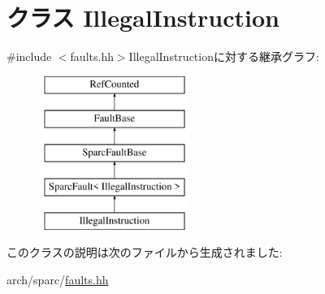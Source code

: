 \hypertarget{classSparcISA_1_1IllegalInstruction}{
\section{クラス IllegalInstruction}
\label{classSparcISA_1_1IllegalInstruction}
}


{\ttfamily \#include $<$faults.hh$>$}IllegalInstructionに対する継承グラフ:\begin{figure}[H]
\begin{center}
\leavevmode
\includegraphics[height=5cm]{classSparcISA_1_1IllegalInstruction}
\end{center}
\end{figure}


このクラスの説明は次のファイルから生成されました:\begin{DoxyCompactItemize}
\item 
arch/sparc/\hyperlink{arch_2sparc_2faults_8hh}{faults.hh}\end{DoxyCompactItemize}
